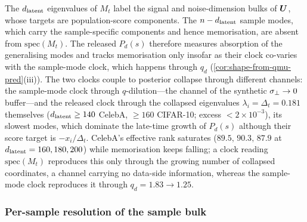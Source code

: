 \begin{remark}\label{rem:spec-Mt-misses-mem-pred}
The $d_{\mathrm{latent}}$ eigenvalues of $M_t$ label the signal and noise-dimension bulks of $\bm{U}$, whose targets are population-score components. The $n-d_{\mathrm{latent}}$ sample modes, which carry the sample-specific components and hence memorisation, are absent from $\mathrm{spec}(M_t)$. The released $P_d(s)$ therefore measures absorption of the generalising modes and tracks memorisation only insofar as their clock co-varies with the sample-mode clock, which happens through $q_d$ (\cref{cor:shape-from-qmu-pred}(iii)). The two clocks couple to posterior collapse through different channels: the sample-mode clock through $q$-dilution---the channel of the synthetic $\sigma_{\perp}\to0$ buffer---and the released clock through the collapsed eigenvalues $\lambda_i=\Delta_t=0.181$ themselves ($d_{\mathrm{latent}}\ge140$ CelebA, $\ge160$ CIFAR-10; excess $<2\times10^{-3}$), its slowest modes, which dominate the late-time growth of $P_d(s)$ although their score target is $-x_i/\Delta_t$. CelebA's effective rank saturates ($89.5,\,90.3,\,87.9$ at $d_{\mathrm{latent}}=160,180,200$) while memorisation keeps falling; a clock reading $\mathrm{spec}(M_t)$ reproduces this only through the growing number of collapsed coordinates, a channel carrying no data-side information, whereas the sample-mode clock reproduces it through $q_d=1.83\to1.25$.
\end{remark}

\subsubsection{Per-sample resolution of the sample bulk}

